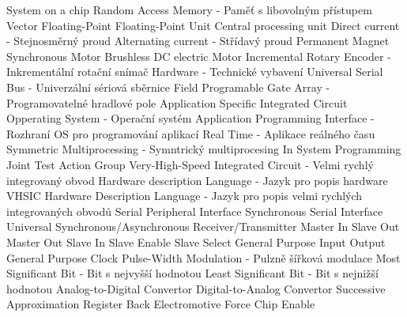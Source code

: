  {System on a chip}
 {Random Access Memory - Paměť s libovolným přístupem}
 {Vector Floating-Point}
 {Floating-Point Unit}
 {Central processing unit}
 {Direct current - Stejnosměrný proud}
 {Alternating current - Střídavý proud}
 {Permanent Magnet Synchronous Motor}
 {Brushless DC electric Motor}
 {Incremental Rotary Encoder - Inkrementální rotační snímač}
 {Hardware - Technické vybavení}
 {Universal Serial Bus - Univerzální sériová sběrnice}
 {Field Programable Gate Array - Programovatelné hradlové pole}
 {Application Specific Integrated Circuit}
 {Opperating System - Operační systém}
 {Application Programming Interface - Rozhraní OS pro programování aplikací}
 {Real Time - Aplikace reálného času}
 {Symmetric Multiprocessing - Symntrický multiprocesing}
 {In System Programming}
 {Joint Test Action Group}
 {Very-High-Speed Integrated Circuit - Velmi rychlý integrovaný obvod}
 {Hardware description Language - Jazyk pro popis hardware}
 {VHSIC Hardware Description Language - Jazyk pro popis velmi rychlých integrovaných obvodů}
 {Serial Peripheral Interface}
 {Synchronous Serial Interface}
 {Universal Synchronous/Asynchronous Receiver/Transmitter}
 {Master In Slave Out}
 {Master Out Slave In}
 {Slave Enable}
 {Slave Select}
 {General Purpose Input Output}
 {General Purpose Clock}
 {Pulse-Width Modulation - Pulzně šířková modulace}
 {Most Significant Bit - Bit s nejvyšší hodnotou}
 {Least Significant Bit - Bit s nejnižší hodnotou}
 {Analog-to-Digital Convertor}
 {Digital-to-Analog Convertor}
 {Successive Approximation Register}
 {Back Electromotive Force}
 {Chip Enable}